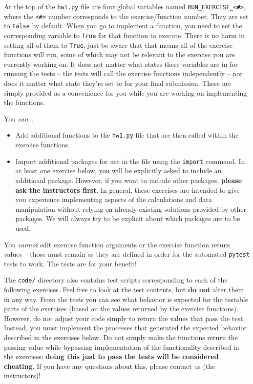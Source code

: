 \documentclass[10pt]{article}
\begin{document}
\begin{enumerate}
At the top of the {\tt hw1.py} file are four global variables named {\tt RUN\_EXERCISE\_<\#>}, where the {\tt <\#>} number corresponds to the exercise/function number. They are set to {\tt False} by default. When you go to implement a function, you need to set the corresponding variable to {\tt True} for that function to execute. There is no harm in setting all of them to {\tt True}, just be aware that that means all of the exercise functions will run, some of which may not be relevant to the exercise you are currently working on. It does not matter what states these variables are in for running the tests -- the tests will call the exercise functions independently -- nor does it matter what state they're set to for your final submission. These are simply provided as a convenience for you while you are working on implementing the functions.

You {\em can}...
\begin{itemize}
\item Add additional functions to the {\tt hw1.py} file that are then called within the exercise functions. 
\item Import additional packages for use in the file using the {\tt import} command. In at least one exercise below, you will be explicitly asked to include an additioanl package. However, if you want to include other packages, {\bf please ask the instructors first}. In general, these exercises are intended to give you experience implementing aspects of the calculations and data manipulation without relying on already-existing solutions provided by other packages. We will always try to be explicit about which packages are to be used.
\end{itemize}

You {\em cannot} edit exercise function arguments or the exercise function return values -- those must remain as they are defined in order for the automated {\tt pytest} tests to work. The tests are for your benefit!

The {\tt code/} directory also contains test scripts corresponding to each of the following exercises. Feel free to look at the test contents, but {\bf do not} alter them in any way. From the tests you can see what behavior is expected for the testable parts of the exercises (based on the values returned by the exercise functions). However, do not adjust your code simply to return the values that pass the test. Instead, you must implement the processes that generated the expected behavior described in the exercises below. Do not simply make the functions return the passing value while bypassing implementation of the functionality described in the exercises; {\bf doing this just to pass the tests will be considered cheating}. If you have any questions about this, please contact us (the instructors)!


\end{enumerate}
\end{document}
